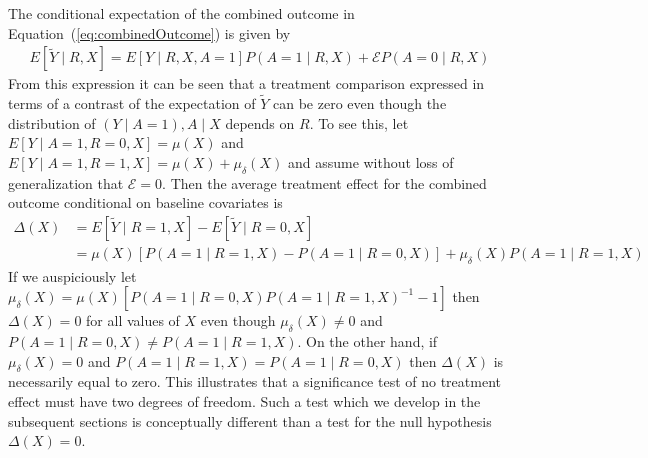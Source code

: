 The conditional expectation of the combined outcome in Equation~(\ref{eq:combinedOutcome}) is given by
\begin{align*}
  E[\widetilde{Y} \mid R, X] = E[Y \mid R, X, A = 1]P(A = 1 \mid R, X) + \mathcal{E}P(A = 0 \mid R, X)
\end{align*}
From this expression it can be seen that a treatment comparison expressed in terms of a contrast of the expectation of $\widetilde{Y}$ can be zero even though the distribution of $(Y \mid A = 1), A \mid X$ depends on $R$. To see this, let $E[Y \mid A = 1, R = 0, X] = \mu(X)$ and $E[Y \mid A = 1, R = 1, X] = \mu(X) + \mu_{\delta}(X)$ and assume without loss of generalization that $\mathcal{E} = 0$. Then the average treatment effect for the combined outcome conditional on baseline covariates is
\begin{align}
  \Delta(X) &= E[\widetilde{Y} \mid R = 1, X] - E[\widetilde{Y} \mid R = 0, X]\label{eq:Delta}\\
  &= \mu(X)\left[P(A = 1 \mid R = 1, X) - P(A = 1 \mid R = 0, X)\right] + \mu_{\delta}(X)P(A = 1 \mid R = 1, X)\nonumber
\end{align}
If we auspiciously let $\mu_{\delta}(X) = \mu(X)\left[P(A = 1 \mid R = 0, X) P(A = 1 \mid R = 1, X)^{-1} - 1\right]$ then $\Delta(X) = 0$ for all values of $X$ even though $\mu_{\delta}(X) \ne 0$ and $P(A = 1 \mid R = 0, X) \ne P(A = 1 \mid R = 1, X)$. On the other hand, if $\mu_\delta(X) = 0$ and $P(A = 1 \mid R = 1, X) = P(A = 1 \mid R = 0, X)$ then $\Delta(X)$ is necessarily equal to zero. This illustrates that a significance test of no treatment effect must have two degrees of freedom. Such a test which we develop in the subsequent sections is conceptually different than a test for the null hypothesis $\Delta(X) = 0$.

